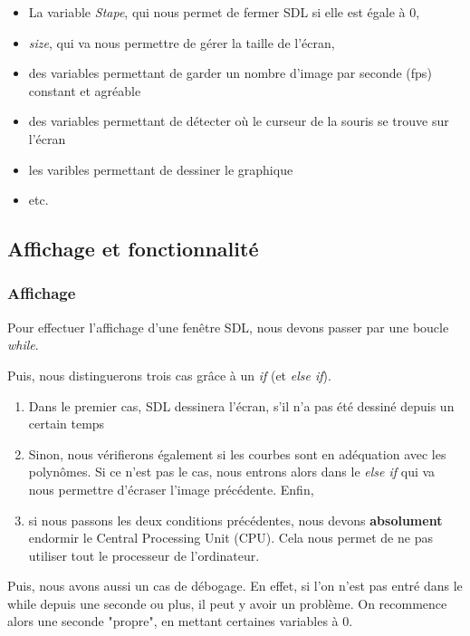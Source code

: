 \documentclass[letter]{article}
\begin{document}
\begin{itemize}
\item La variable \emph{Stape}, qui nous permet de fermer SDL si elle est égale à 0,
\item \emph{size}, qui va nous permettre de gérer la taille de l'écran,
\item des variables permettant de garder un nombre d'image par seconde (fps) constant et agréable
\item des variables permettant de détecter où le curseur de la souris se trouve sur l'écran
\item les varibles permettant de dessiner le graphique
\item etc.
\end{itemize}




\subsection{Affichage et fonctionnalité}
\label{sec:orga04fbb7}

\subsubsection{Affichage}
\label{sec:orgb90d9de}

Pour effectuer l'affichage d'une fenêtre SDL, nous devons passer par une boucle \emph{while}.

Puis, nous distinguerons trois cas grâce à un \emph{if} (et \emph{else if}).

\begin{enumerate}
\item Dans le premier cas, SDL dessinera l'écran, s'il n'a pas été dessiné depuis un certain temps
\item Sinon, nous vérifierons également si les courbes sont en adéquation avec les polynômes. Si ce n'est pas le cas, nous entrons alors dans le \emph{else if} qui va nous permettre d'écraser l'image précédente. Enfin,
\item si nous passons les deux conditions précédentes, nous devons \textbf{absolument} endormir le Central Processing Unit (CPU). Cela nous permet de ne pas utiliser tout le processeur de l'ordinateur.
\end{enumerate}

Puis, nous avons aussi un cas de débogage. En effet, si l'on n'est pas entré dans le while depuis une seconde ou plus, il peut y avoir un problème. On recommence alors une seconde "propre", en mettant certaines variables à 0.
\end{document}
